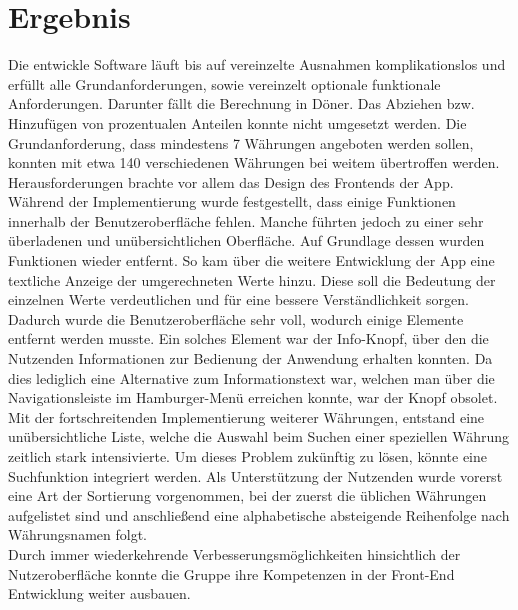 \documentclass[conference]{IEEEtran}
\begin{document}
\section{Ergebnis}
Die entwickle Software läuft bis auf vereinzelte Ausnahmen komplikationslos und erfüllt alle Grundanforderungen, sowie vereinzelt optionale funktionale Anforderungen. Darunter fällt die Berechnung in Döner.  Das Abziehen bzw. Hinzufügen von prozentualen Anteilen konnte nicht umgesetzt werden. Die Grundanforderung, dass mindestens 7 Währungen angeboten werden sollen, konnten mit etwa 140 verschiedenen Währungen bei weitem übertroffen werden.\\
Herausforderungen brachte vor allem das Design des Frontends der App. Während der Implementierung wurde festgestellt, dass einige Funktionen innerhalb der Benutzeroberfläche fehlen. Manche führten jedoch zu einer sehr überladenen und unübersichtlichen Oberfläche. Auf Grundlage dessen wurden Funktionen wieder entfernt. So kam über die weitere Entwicklung der App eine textliche Anzeige der umgerechneten Werte hinzu. Diese soll die Bedeutung der einzelnen Werte verdeutlichen und für eine bessere Verständlichkeit sorgen. Dadurch wurde die Benutzeroberfläche sehr voll, wodurch einige Elemente entfernt werden musste. Ein solches Element war der Info-Knopf, über den die Nutzenden Informationen zur Bedienung der Anwendung erhalten konnten. Da dies lediglich eine Alternative zum Informationstext war, welchen man über die Navigationsleiste im Hamburger-Menü erreichen konnte, war der Knopf obsolet. \\
Mit der fortschreitenden Implementierung weiterer Währungen, entstand eine unübersichtliche Liste, welche die Auswahl beim Suchen einer speziellen Währung zeitlich stark intensivierte. Um dieses Problem zukünftig zu lösen, könnte eine Suchfunktion integriert werden. Als Unterstützung der Nutzenden wurde vorerst eine Art der Sortierung vorgenommen, bei der zuerst die üblichen Währungen aufgelistet sind und anschließend eine alphabetische absteigende Reihenfolge nach Währungsnamen folgt. \\
Durch immer wiederkehrende Verbesserungsmöglichkeiten hinsichtlich der Nutzeroberfläche konnte die Gruppe ihre Kompetenzen in der Front-End Entwicklung weiter ausbauen.
\end{document}
